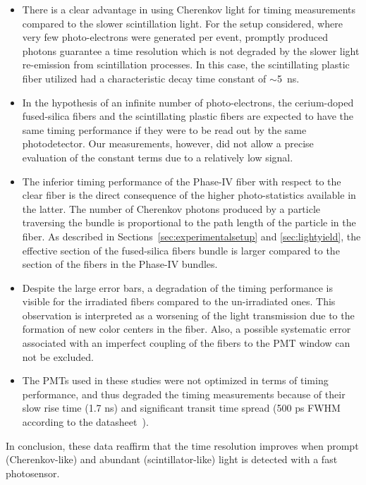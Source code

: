 \documentclass[a4paper,11pt]{article}
\begin{document}
\begin{itemize}
\item There is a clear advantage in using Cherenkov light for timing measurements compared to the slower scintillation light. For the setup considered, where very few photo-electrons were generated per event, promptly produced photons guarantee a time resolution which is not degraded by the slower light re-emission from scintillation processes. In this case, the scintillating plastic fiber utilized had a characteristic decay time constant of $\sim$5~ns.
\item In the hypothesis of an infinite number of photo-electrons, the cerium-doped fused-silica fibers and the scintillating plastic fibers are expected to have the same timing performance if they were to be read out by the same photodetector. Our measurements, however, did not allow a precise evaluation of the constant terms due to a relatively low signal.
\item The inferior timing performance of the Phase-IV fiber with respect to the clear fiber is the direct consequence of the higher photo-statistics available in the latter. The number of Cherenkov photons produced by a particle traversing the bundle is proportional to the path length of the particle in the fiber. As described in Sections~\ref{sec:experimentalsetup} and \ref{sec:lightyield}, the effective section of the fused-silica fibers bundle is larger compared to the section of the fibers in the Phase-IV bundles.
\item Despite the large error bars, a degradation of the timing performance is visible for the irradiated fibers compared to the un-irradiated ones. This observation is interpreted as a worsening of the light transmission due to the formation of new color centers in the fiber. Also, a possible systematic error associated with an imperfect coupling of the fibers to the PMT window can not be excluded.
\item The PMTs used in these studies were not optimized in terms of timing performance, and thus degraded the timing measurements because of their slow rise time (1.7 ns) and significant transit time spread (500 ps FWHM according to the datasheet~\cite{r-PMT}).
\end{itemize}
In conclusion, these data reaffirm that the time resolution improves when prompt (Cherenkov-like) and abundant (scintillator-like) light is detected with a fast photosensor.
\end{document}
